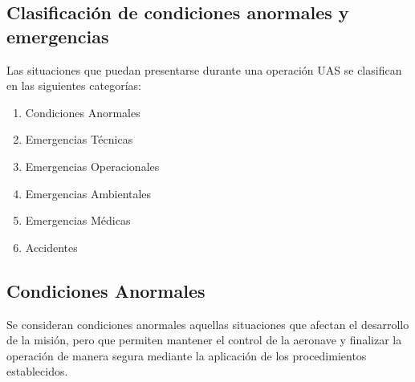 \subsection{Clasificación de condiciones anormales y emergencias}

Las situaciones que puedan presentarse durante una operación UAS se clasifican en las siguientes categorías:

\begin{enumerate}[label=\Alph*.]

\item Condiciones Anormales

\item Emergencias Técnicas

\item Emergencias Operacionales

\item Emergencias Ambientales

\item Emergencias Médicas

\item Accidentes

\end{enumerate}


\subsection{Condiciones Anormales}

Se consideran condiciones anormales aquellas situaciones que afectan el desarrollo de la misión, pero que permiten mantener el control de la aeronave y finalizar la operación de manera segura mediante la aplicación de los procedimientos establecidos.

\renewcommand{\arraystretch}{1.4}

